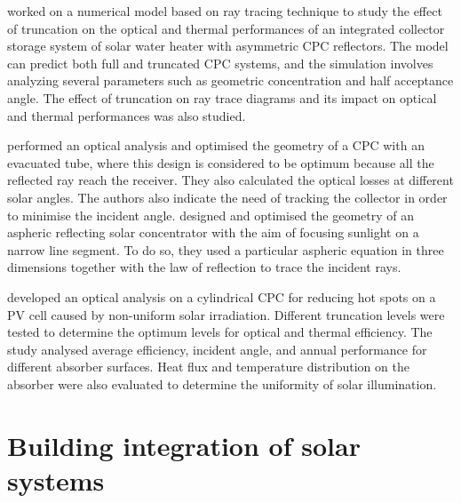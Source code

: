 \citet{Benrejeb2016} worked on a numerical model based on ray tracing technique to study the effect of truncation on the optical and thermal performances of an integrated collector storage system of solar water heater with asymmetric CPC reflectors. The model can predict both full and truncated CPC systems, and the simulation involves analyzing several parameters such as geometric concentration and half acceptance angle. The effect of truncation on ray trace diagrams and its impact on optical and thermal performances was also studied.

\citet{Bellos2016} performed an optical analysis and optimised the geometry of a CPC with an evacuated tube, where this design is considered to be optimum because all the reflected ray reach the receiver. They also calculated the optical losses at different solar angles. The authors also indicate the need of tracking the collector in order to minimise the incident angle. \citet{Qin2013} designed and optimised the geometry of an aspheric reflecting solar concentrator with the aim of focusing sunlight on a narrow line segment. To do so, they used a particular aspheric equation in three dimensions together with the law of reflection to trace the incident rays.

\citet{Ustaoglu2016} developed an optical analysis on a cylindrical CPC for reducing hot spots on a PV cell caused by non-uniform solar irradiation. Different truncation levels were tested to determine the optimum levels for optical and thermal efficiency. The study analysed average efficiency, incident angle, and annual performance for different absorber surfaces. Heat flux and temperature distribution on the absorber were also evaluated to determine the uniformity of solar illumination.




\section{Building integration of solar systems}




	
